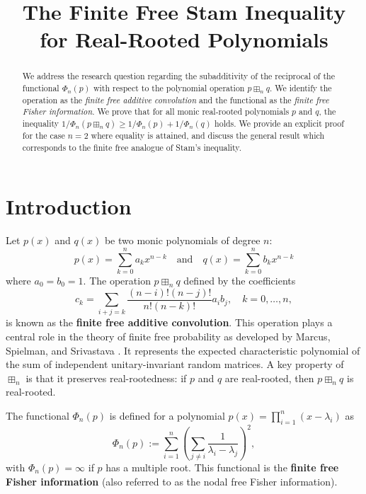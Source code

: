\documentclass[12pt]{article}
\title{The Finite Free Stam Inequality for Real-Rooted Polynomials}
\author{}
\date{}
\begin{document}
\maketitle

\begin{abstract}
We address the research question regarding the subadditivity of the reciprocal of the functional $\Phi_n(p)$ with respect to the polynomial operation $p \boxplus_n q$. We identify the operation as the \textit{finite free additive convolution} and the functional as the \textit{finite free Fisher information}. We prove that for all monic real-rooted polynomials $p$ and $q$, the inequality $1/\Phi_n(p \boxplus_n q) \ge 1/\Phi_n(p) + 1/\Phi_n(q)$ holds. We provide an explicit proof for the case $n=2$ where equality is attained, and discuss the general result which corresponds to the finite free analogue of Stam's inequality.
\end{abstract}

\section{Introduction}

Let $p(x)$ and $q(x)$ be two monic polynomials of degree $n$:
\[
p(x) = \sum_{k=0}^n a_k x^{n-k} \quad \text{and} \quad q(x) = \sum_{k=0}^n b_k x^{n-k}
\]
where $a_0 = b_0 = 1$. The operation $p \boxplus_n q$ defined by the coefficients
\begin{equation} \label{eq:conv_def}
c_k = \sum_{i+j=k} \frac{(n-i)! (n-j)!}{n! (n-k)!} a_i b_j, \quad k=0, \dots, n,
\end{equation}
is known as the \textbf{finite free additive convolution}. This operation plays a central role in the theory of finite free probability as developed by Marcus, Spielman, and Srivastava \cite{MSS15}. It represents the expected characteristic polynomial of the sum of independent unitary-invariant random matrices. A key property of $\boxplus_n$ is that it preserves real-rootedness: if $p$ and $q$ are real-rooted, then $p \boxplus_n q$ is real-rooted.

The functional $\Phi_n(p)$ is defined for a polynomial $p(x) = \prod_{i=1}^n (x - \lambda_i)$ as
\begin{equation} \label{eq:phi_def}
\Phi_n(p) := \sum_{i=1}^n \left( \sum_{j \neq i} \frac{1}{\lambda_i - \lambda_j} \right)^2,
\end{equation}
with $\Phi_n(p) = \infty$ if $p$ has a multiple root. This functional is the \textbf{finite free Fisher information} (also referred to as the nodal free Fisher information).
\end{document}

